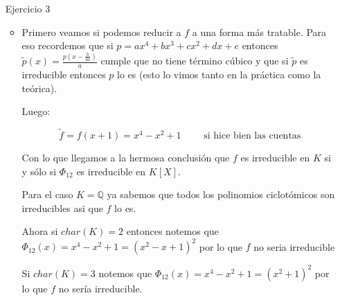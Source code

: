 \documentclass[11pt]{article}
\newcommand{\Q}{\mathbb{Q}}
\newcommand{\Z}{\mathbb{Z}}
\newcommand{\ip}[1]{\left\langle#1\right\rangle}
\newcommand{\quotient}[2]{{\raisebox{.2em}{$#1$}\left/\raisebox{-.2em}{$#2$}\right.}}
\numberwithin{theorem}{subsection}
\newcommand{\qed}{\nobreak \ifvmode \relax \else
	\ifdim\lastskip<1.5em \hskip-\lastskip
	\hskip1.5em plus0em minus0.5em \fi \nobreak
	\vrule height0.75em width0.5em depth0.25em\fi}
\begin{document}
\begin{enumerate}
\begin{itemize}
		\item \textcolor{red}{Notemos que si tomamos ahora $\sigma \circ \tau$ entonces $\Q[\beta]^{\ip{\sigma \circ \tau}} = \Q[\gamma]$. Como $\left(\sigma \circ \tau \right)^2 = \sigma^2 \circ \tau^2 = \sigma^4 = Id$ entonces sabemos que $\ip{\sigma \circ \tau} < \Z_4 \times \Z_2$ tiene \'indice 4; luego por el teorema de correspondencia de Galois sabemos que una subextensi\'on de $\quotient{\Q[\beta]}{\Q}$ de orden 4 es $\Q[\gamma]$}.\qed
		
	\end{itemize}
	
	\item[Ejercicio 3] 
	
	\begin{itemize}
		\item Primero veamos si podemos reducir a $f$ a una forma m\'as tratable. Para eso recordemos que si $p = ax^4  + bx^3 + cx^2 + dx + e$ entonces $\widetilde{p}(x) = \frac{p(x- \frac{b}{4a})}{a}$ cumple que no tiene t\'ermino c\'ubico y que si $\widetilde{p}$ es irreducible entonces $p$ lo es (esto lo vimos tanto en la pr\'actica como la te\'orica).
		
		Luego:
		
		\begin{equation*}
			\widetilde{f} = f\left(x +1\right) = x^4 - x^2 + 1 \qquad \text{ si hice bien las cuentas}
		\end{equation*}
		
		Con lo que llegamos a la hermosa conclusi\'on que $f$ es irreducible en $K$ si y s\'olo si $\Phi_{12}$ es irreducible en $K[X]$.
		
		Para el caso $K= \Q$ ya sabemos que todos los polinomios ciclot\'omicos son irreducibles asi que $f$ lo es.
		
		Ahora si $char(K) =2$ entonces notemos que $\Phi_{12} (x) = x^4 - x^2 + 1 = \left(x^2 - x + 1\right)^2$ por lo que $f$ no seria irreducible
		
		Si $char(K) = 3$ notemos que $\Phi_{12} (x) = x^4 - x^2 + 1 = \left(x^2 + 1\right)^2$ por lo que $f$ no ser\'ia irreducible.
		

\end{itemize}
\end{enumerate}
\end{document}
